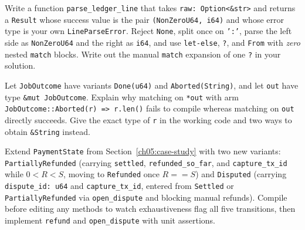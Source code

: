 \begin{exercise}
\label{ch05:ex-desugar-refactor}
Write a function \texttt{parse\_\allowbreak{}ledger\_\allowbreak{}line} that takes \texttt{raw: Option<\&str>} and returns a \texttt{Result} whose success value is the pair \texttt{(NonZeroU64, i64)} and whose error type is your own \texttt{LineParseError}. Reject \texttt{None}, split once on \texttt{':'}, parse the left side as \texttt{NonZeroU64} and the right as \texttt{i64}, and use \texttt{let-else}, \texttt{?}, and \texttt{From} with \emph{zero} nested \texttt{match} blocks. Write out the manual \texttt{match} expansion of one \texttt{?} in your solution.
\end{exercise}

\begin{exercise}
\label{ch05:ex-match-ergonomics}
Let \texttt{JobOutcome} have variants \texttt{Done(u64)} and \texttt{Aborted(String)}, and let \texttt{out} have type \texttt{\&mut JobOutcome}. Explain why matching on \texttt{*out} with arm \texttt{JobOutcome::Aborted(r) => r.len()} fails to compile whereas matching on \texttt{out} directly succeeds. Give the exact type of \texttt{r} in the working code and two ways to obtain \texttt{\&String} instead.
\end{exercise}

\begin{exercise}
\label{ch05:ex-extend-payment-order}
Extend \texttt{PaymentState} from Section~\ref{ch05:case-study} with two new variants: \texttt{Partially\allowbreak{}Refunded} (carrying \texttt{settled}, \texttt{refunded\_\allowbreak{}so\_\allowbreak{}far}, and \texttt{capture\_\allowbreak{}tx\_\allowbreak{}id} while $0 < R < S$, moving to \texttt{Refunded} once $R == S$) and \texttt{Disputed} (carrying \texttt{dispute\_id: u64} and \texttt{capture\_\allowbreak{}tx\_\allowbreak{}id}, entered from \texttt{Settled} or \texttt{Partially\allowbreak{}Refunded} via \texttt{open\_dispute} and blocking manual refunds). Compile before editing any methods to watch exhaustiveness flag all five transitions, then implement \texttt{refund} and \texttt{open\_dispute} with unit assertions.
\end{exercise}
